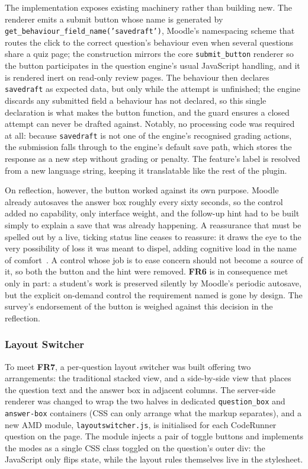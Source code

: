 The implementation exposes existing machinery rather than building new. The renderer emits a submit button whose name is generated by \texttt{get\_behaviour\_field\_name('savedraft')}, Moodle's namespacing scheme that routes the click to the correct question's behaviour even when several questions share a quiz page; the construction mirrors the core \texttt{submit\_button} renderer so the button participates in the question engine's usual JavaScript handling, and it is rendered inert on read-only review pages. The behaviour then declares \texttt{savedraft} as expected data, but only while the attempt is unfinished; the engine discards any submitted field a behaviour has not declared, so this single declaration is what makes the button function, and the guard ensures a closed attempt can never be drafted against. Notably, no processing code was required at all: because \texttt{savedraft} is not one of the engine's recognised grading actions, the submission falls through to the engine's default save path, which stores the response as a new step without grading or penalty. The feature's label is resolved from a new language string, keeping it translatable like the rest of the plugin.

On reflection, however, the button worked against its own purpose. Moodle already autosaves the answer box roughly every sixty seconds, so the control added no capability, only interface weight, and the follow-up hint had to be built simply to explain a save that was already happening. A reassurance that must be spelled out by a live, ticking status line ceases to reassure: it draws the eye to the very possibility of loss it was meant to dispel, adding cognitive load in the name of comfort~\cite{dontmakemethink}. A control whose job is to ease concern should not become a source of it, so both the button and the hint were removed. \textbf{FR6} is in consequence met only in part: a student's work is preserved silently by Moodle's periodic autosave, but the explicit on-demand control the requirement named is gone by design. The survey's endorsement of the button is weighed against this decision in the reflection.

\subsubsection{Layout Switcher}
To meet \textbf{FR7}, a per-question layout switcher was built offering two arrangements: the traditional stacked view, and a side-by-side view that places the question text and the answer box in adjacent columns. The server-side renderer was changed to wrap the two halves in dedicated \texttt{question\_box} and \texttt{answer-box} containers (CSS can only arrange what the markup separates), and a new AMD module, \texttt{layoutswitcher.js}, is initialised for each CodeRunner question on the page. The module injects a pair of toggle buttons and implements the modes as a single CSS class toggled on the question's outer div: the JavaScript only flips state, while the layout rules themselves live in the stylesheet.

